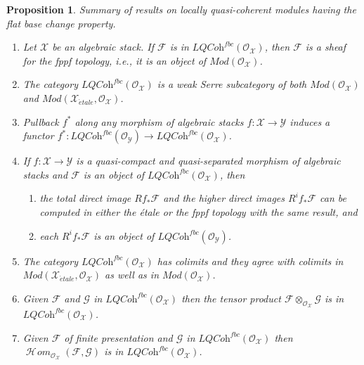 \documentclass{stacks-project}
\theoremstyle{plain}
\newtheorem{proposition}[subsection]{Proposition}
\theoremstyle{definition}
\theoremstyle{remark}
\numberwithin{equation}{subsection}
\def\SheafHom{\mathop{\mathcal{H}\!\mathit{om}}\nolimits}
\def\etale{{\acute{e}tale}}
\begin{document}
\begin{proposition}
\label{proposition-loc-qcoh-flat-base-change}
Summary of results on locally quasi-coherent modules having the flat
base change property.
\begin{enumerate}
\item Let $\mathcal{X}$ be an algebraic stack.
If $\mathcal{F}$ is in $\textit{LQCoh}^{fbc}(\mathcal{O}_\mathcal{X})$,
then $\mathcal{F}$ is a sheaf for the fppf topology, i.e., it is
an object of $\textit{Mod}(\mathcal{O}_\mathcal{X})$.
\item The category $\textit{LQCoh}^{fbc}(\mathcal{O}_\mathcal{X})$
is a weak Serre subcategory of both $\textit{Mod}(\mathcal{O}_\mathcal{X})$
and $\textit{Mod}(\mathcal{X}_\etale, \mathcal{O}_\mathcal{X})$.
\item Pullback $f^*$ along any morphism of algebraic stacks
$f : \mathcal{X} \to \mathcal{Y}$ induces a functor
$f^* : \textit{LQCoh}^{fbc}(\mathcal{O}_\mathcal{Y}) \to
\textit{LQCoh}^{fbc}(\mathcal{O}_\mathcal{X})$.
\item If $f : \mathcal{X} \to \mathcal{Y}$ is a
quasi-compact and quasi-separated morphism of algebraic stacks
and $\mathcal{F}$ is an object of
$\textit{LQCoh}^{fbc}(\mathcal{O}_\mathcal{X})$, then
\begin{enumerate}
\item the total direct image $Rf_*\mathcal{F}$ and the higher direct
images $R^if_*\mathcal{F}$ can be computed in either the \'etale or the
fppf topology with the same result, and
\item each $R^if_*\mathcal{F}$ is an object of
$\textit{LQCoh}^{fbc}(\mathcal{O}_\mathcal{Y})$.
\end{enumerate}
\item The category $\textit{LQCoh}^{fbc}(\mathcal{O}_\mathcal{X})$ has
colimits and they agree with colimits in
$\textit{Mod}(\mathcal{X}_\etale, \mathcal{O}_\mathcal{X})$
as well as in $\textit{Mod}(\mathcal{O}_\mathcal{X})$.
\item Given $\mathcal{F}$ and $\mathcal{G}$ in
$\textit{LQCoh}^{fbc}(\mathcal{O}_\mathcal{X})$ then the tensor product
$\mathcal{F} \otimes_{\mathcal{O}_\mathcal{X}} \mathcal{G}$
is in $\textit{LQCoh}^{fbc}(\mathcal{O}_\mathcal{X})$.
\item Given $\mathcal{F}$ of finite presentation and $\mathcal{G}$ in
$\textit{LQCoh}^{fbc}(\mathcal{O}_\mathcal{X})$ then
$\SheafHom_{\mathcal{O}_\mathcal{X}}(\mathcal{F}, \mathcal{G})$
is in $\textit{LQCoh}^{fbc}(\mathcal{O}_\mathcal{X})$.
\end{enumerate}
\end{proposition}
\end{document}
